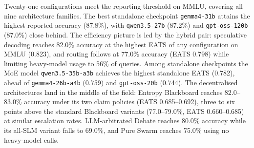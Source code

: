 Twenty-one configurations meet the reporting threshold on MMLU, covering all nine architecture families. The best standalone checkpoint \texttt{gemma4-31b} attains the highest reported accuracy (87.8\%), with \texttt{qwen3.5-27b} (87.2\%) and \texttt{gpt-oss-120b} (87.0\%) close behind. The efficiency picture is led by the hybrid pair: speculative decoding reaches 82.0\% accuracy at the highest EATS of any configuration on MMLU (0.823), and routing follows at 77.0\% accuracy (EATS 0.798) while limiting heavy-model usage to 56\% of queries. Among standalone checkpoints the MoE model \texttt{qwen3.5-35b-a3b} achieves the highest standalone EATS (0.782), ahead of \texttt{gemma4-26b-a4b} (0.759) and \texttt{gpt-oss-20b} (0.744). The decentralised architectures land in the middle of the field: Entropy Blackboard reaches 82.0--83.0\% accuracy under its two claim policies (EATS 0.685--0.692), three to six points above the standard Blackboard variants (77.0--79.0\%, EATS 0.660--0.685) at similar escalation rates. LLM-arbitrated Debate reaches 80.0\% accuracy while its all-SLM variant falls to 69.0\%, and Pure Swarm reaches 75.0\% using no heavy-model calls.

